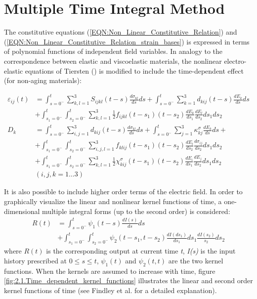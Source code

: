 \section{Multiple Time Integral Method} 
The constitutive equations (\ref{EQN:Non_Linear_Constitutive_Relation}) and
(\ref{EQN:Non_Linear_Constitutive_Relation_strain_bases}) is expressed in terms of polynomial functions of independent field variables.
In analogy to the correspondence between elastic and viscoelastic materials,
 the nonlinear electro-elastic equations of Tiersten (\cite{tiersten1993electroelastic}) is modified to include the time-dependent effect (for non-aging materials):
  
\begin{equation}
\begin{aligned}
\varepsilon _{ij} (t) &=
\int_{s=0^{-}}^{t} 
\sum_{k,l=1}^3 {S_{ijkl}}(t-s)
\frac{d{\sigma_{kl}}}{ds}ds
+
\int_{s=0^{-}}^{t} 
\sum_{k=1}^3 d_{kij}(t-s)
\frac{d{E_k}}{ds}ds  \\
&+ \int_{s_1=0^{-}}^{t}
\int_{s_2=0^{-}}^{t} 
\sum_{k,l=1}^3 
\frac{1}{2}{f}_{ijkl}(t-s_1)(t-s_2)
\frac{d{E_k}}{ds_1}
\frac{d{E_l}}{ds_2}ds_1 ds_2
\\
{D_k} &=  
\int_{s=0^{-}}^{t} \sum_{i,j=1}^3 {d_{kij}}(t-s)
\frac{d{\sigma_{kl}}}{ds}ds + 
\int_{s=0^{-}}^{t} 
\sum_{j=1}^3 {\kappa^{\sigma}_{kj}}
\frac{d{E_k}}{ds}ds + \\
&+ \int_{s_1=0^{-}}^{t}
\int_{s_2=0^{-}}^{t} 
\sum_{i,j,l=1}^3 {f}_{klij}(t-s_1)(t-s_2) \frac{d{E_l}}{ds_2}\frac{d{ \sigma _{ij} }}{ds_2}ds_1  ds_2
\\
&+ 
\int_{s_1=0^{-}}^{t}
\int_{s_2=0^{-}}^{t} 
\sum_{k,l=1}^3 
\frac{1}{2}\chi^{\sigma}_{kij}(t-s_1)(t-s_2)
\frac{d{E_i}}{ds_1}
\frac{d{E_j}}{ds_2}ds_1 ds_2 \\
& (i,j,k=1 \dots 3)  
\end{aligned}
\label{EQN:double_integral_constitutive_equation}
\end{equation} 
 
It is also possible to include higher order terms of the electric field. 
In order to graphically visualize the linear and nonlinear kernel functions of time,
 a one-dimensional multiple integral forms (up to the second order) is considered:
\begin{equation}
\begin{aligned}
R(t)&=\int_{s=0^{-}}^{t} \psi_1(t-s)\frac{dI(s)}{ds}ds \\
&   +\int_{s_1=0^{-}}^{t}\int_{s_2=0^{-}}^{t}\psi_2(t-s_1,t-s_2) \frac{dI(ds_1)}{ds_1}ds_1 \frac{dI(s_2)}{s_2}ds_2
\end{aligned}
\label{EQN:double_integral_sample}
\end{equation}
where $R(t)$ is the corresponding output at current time \textit{t}, \textit{I(s)} is the input history prescribed at $0\leq s \leq t$, $\psi_1(t)$ and $\psi_2(t,t)$ are the two kernel functions.
When the kernels are assumed to increase with time, 
figure \ref{fig:2.1.Time_dependent_kernel_functions} illustrates the linear and second order kernel functions of time 
(see Findley et al. \cite{Findley1976} for a detailed explanation). 

